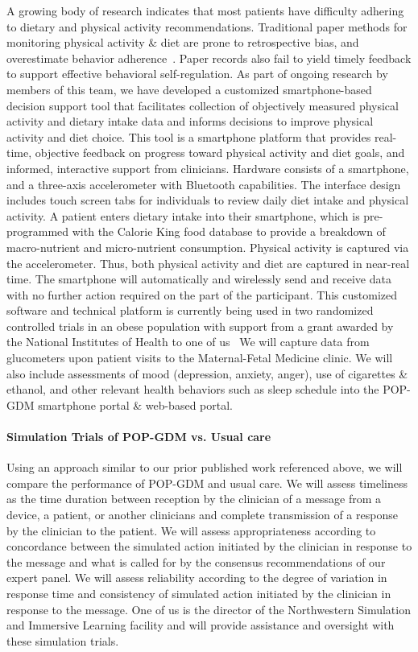 A growing body of research indicates that most patients have
difficulty adhering to dietary and physical activity
recommendations. Traditional paper methods for monitoring physical
activity \& diet are prone to retrospective bias, and overestimate
behavior adherence~\citep{Stone2002}. Paper records also fail to yield
timely feedback to support effective behavioral self-regulation. As
part of ongoing research by members of this team, we have developed a
customized smartphone-based decision support tool that facilitates
collection of objectively measured physical activity and dietary
intake data and informs decisions to improve physical activity and
diet choice. This tool is a smartphone platform that provides
real-time, objective feedback on progress toward physical activity and
diet goals, and informed, interactive support from
clinicians. Hardware consists of a smartphone, and a three-axis
accelerometer with Bluetooth capabilities. The interface design
includes touch screen tabs for individuals to review daily diet intake
and physical activity. A patient enters dietary intake into their
smartphone, which is pre-programmed with the Calorie
King\textregistered{} food database to provide a breakdown of
macro-nutrient and micro-nutrient consumption. Physical activity is
captured via the accelerometer. Thus, both physical activity and diet
are captured in near-real time. The smartphone will automatically and
wirelessly send and receive data with no further action required on
the part of the participant. This customized software and technical
platform is currently being used in two randomized controlled trials
in an obese population with support from a grant awarded by the
National Institutes of Health to one of us~\citep{Spring2009} We will
capture data from glucometers upon patient visits to the
Maternal-Fetal Medicine clinic. We will also include assessments of
mood (depression, anxiety, anger), use of cigarettes \& ethanol, and
other relevant health behaviors such as sleep schedule into the
POP-GDM smartphone portal \& web-based portal.

\paragraph{Simulation Trials of POP-GDM vs. Usual care} Using an
approach similar to our prior published work referenced above, we will
compare the performance of POP-GDM and usual care. We will assess
timeliness as the time duration between reception by the clinician of
a message from a device, a patient, or another clinicians and complete
transmission of a response by the clinician to the patient. We will
assess appropriateness according to concordance between the simulated
action initiated by the clinician in response to the message and what
is called for by the consensus recommendations of our expert panel. We
will assess reliability according to the degree of variation in
response time and consistency of simulated action initiated by the
clinician in response to the message. One of us is the director of the
Northwestern Simulation and Immersive Learning facility and will
provide assistance and oversight with these simulation trials.

